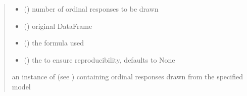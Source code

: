 \documentclass[letterpaper,10pt,english]{sphinxmanual}
\begin{document}
\begin{fulllineitems}
\begin{quote}
\begin{description}
\begin{itemize}
\item {} 
\sphinxAtStartPar
{} () \textendash{} number of ordinal responses to be drawn

\item {} 
\sphinxAtStartPar
{} () \textendash{} original DataFrame

\item {} 
\sphinxAtStartPar
{} () \textendash{} the formula used

\item {} 
\sphinxAtStartPar
{} (\sphinxstyleliteralemphasis{\sphinxupquote{, }}) \textendash{} the  to ensure reproducibility, defaults to None

\end{itemize}

\sphinxAtStartPar
an instance of  (see ) containing ordinal responses drawn from the specified model

\end{description}\end{quote}

\end{fulllineitems}

\end{document}
